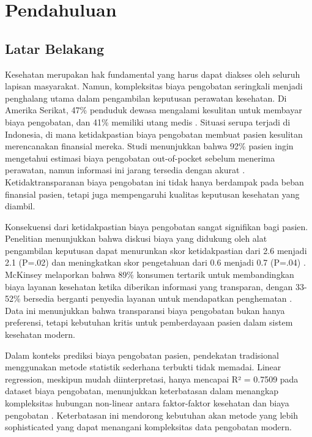 \chapter{Pendahuluan}

\section{Latar Belakang}
Kesehatan merupakan hak fundamental yang harus dapat diakses oleh seluruh lapisan masyarakat. Namun, kompleksitas biaya pengobatan seringkali menjadi penghalang utama dalam pengambilan keputusan perawatan kesehatan. Di Amerika Serikat, 47\% penduduk dewasa mengalami kesulitan untuk membayar biaya pengobatan, dan 41\% memiliki utang medis \citep{KFF2024}. Situasi serupa terjadi di Indonesia, di mana ketidakpastian biaya pengobatan membuat pasien kesulitan merencanakan finansial mereka. Studi menunjukkan bahwa 92\% pasien ingin mengetahui estimasi biaya pengobatan out-of-pocket sebelum menerima perawatan, namun informasi ini jarang tersedia dengan akurat \citep{Sagi2024}. Ketidaktransparanan biaya pengobatan ini tidak hanya berdampak pada beban finansial pasien, tetapi juga mempengaruhi kualitas keputusan kesehatan yang diambil.

Konsekuensi dari ketidakpastian biaya pengobatan sangat signifikan bagi pasien. Penelitian menunjukkan bahwa diskusi biaya yang didukung oleh alat pengambilan keputusan dapat menurunkan skor ketidakpastian dari 2.6 menjadi 2.1 (P=.02) dan meningkatkan skor pengetahuan dari 0.6 menjadi 0.7 (P=.04) \citep{Sagi2024}. McKinsey melaporkan bahwa 89\% konsumen tertarik untuk membandingkan biaya layanan kesehatan ketika diberikan informasi yang transparan, dengan 33-52\% bersedia berganti penyedia layanan untuk mendapatkan penghematan \citep{McKinsey2023}. Data ini menunjukkan bahwa transparansi biaya pengobatan bukan hanya preferensi, tetapi kebutuhan kritis untuk pemberdayaan pasien dalam sistem kesehatan modern.

Dalam konteks prediksi biaya pengobatan pasien, pendekatan tradisional menggunakan metode statistik sederhana terbukti tidak memadai. Linear regression, meskipun mudah diinterpretasi, hanya mencapai R² = 0.7509 pada dataset biaya pengobatan, menunjukkan keterbatasan dalam menangkap kompleksitas hubungan non-linear antara faktor-faktor kesehatan dan biaya pengobatan \citep{Susilo2024}. Keterbatasan ini mendorong kebutuhan akan metode yang lebih sophisticated yang dapat menangani kompleksitas data pengobatan modern.

